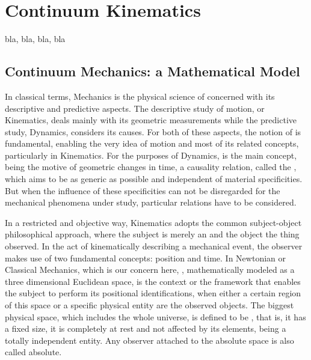 \chapter{Continuum Kinematics}
bla, bla, bla, bla


\section{Continuum Mechanics: a Mathematical Model}

In classical terms, Mechanics is the physical science of  concerned with its descriptive and predictive aspects. The descriptive study of motion, or Kinematics, deals mainly with its geometric measurements while the predictive study, Dynamics, considers its causes. For both of these aspects, the notion of  is fundamental, enabling the very idea of motion and most of its related concepts, particularly in Kinematics. For the purposes of Dynamics,  is the main concept, being the motive of geometric changes in time, a causality relation, called the , which aims to be as generic as possible and independent of material specificities. But when the influence of these specificities can not be disregarded for the mechanical phenomena under study, particular  relations have to be considered. 


In a restricted and objective way, Kinematics adopts the common subject-object philosophical approach, where the subject is merely an  and the object the thing observed. In the act of kinematically describing a mechanical event, the observer makes use of two fundamental concepts: position and time. In Newtonian or Classical Mechanics, which is our concern here, , mathematically modeled as a three dimensional Euclidean space, is the context or the framework that enables the subject to perform its positional identifications, when either a certain region of this space or a specific physical entity are the observed objects. The biggest physical space, which includes the whole universe, is defined to be , that is, it has a fixed size, it is completely at rest and not affected by its elements, being a totally independent entity. Any observer attached to the absolute space is also called absolute. 

